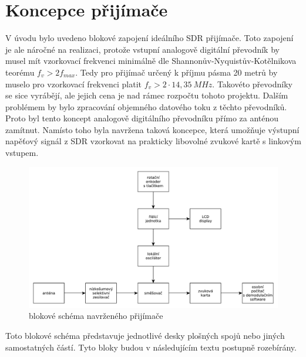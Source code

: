 \section{Koncepce přijímače}
\indent\indent V úvodu bylo uvedeno blokové zapojení ideálního SDR přijímače. Toto zapojení je ale náročné na realizaci, protože vstupní analogově digitální převodník  by musel mít vzorkovací frekvenci minimálně dle Shannonův-Nyquistův-Kotělnikova teorému $f_v > 2f_{max}$. Tedy pro přijímač určený k příjmu pásma 20 metrů by muselo pro vzorkovací frekvenci platit $f_v > 2 \cdot 14,35~MHz$. Takovéto převodníky se sice vyrábějí, ale jejich cena je nad rámec rozpočtu tohoto projektu. Dalším problémem by bylo zpracování objemného datového toku z těchto převodníků. Proto byl  tento koncept analogově digitálního převodníku přímo za anténou zamítnut. Namísto toho byla navržena taková koncepce, která umožňuje výstupní napěťový signál z SDR vzorkovat na prakticky libovolné zvukové kartě s linkovým vstupem.
\begin{figure}[H]
	\centering
	\includegraphics[width=170mm]{img/bs_sdr.pdf}
	\caption{blokové schéma navrženého přijímače}    		
\end{figure}

Toto blokové schéma představuje jednotlivé desky plošných spojů nebo jiných samostatných částí. Tyto bloky budou v následujícím textu postupně rozebírány.





\clearpage